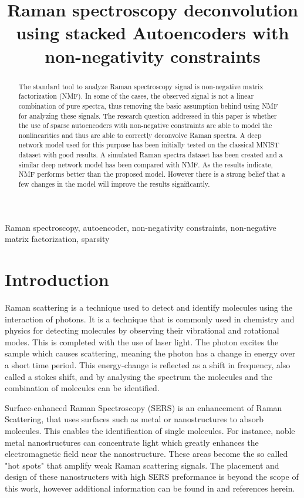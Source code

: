 \documentclass{article}
\title{Raman spectroscopy deconvolution using stacked Autoencoders with non-negativity constraints}
\begin{document}
%

\maketitle
%
\begin{abstract}
The standard tool to analyze Raman spectroscopy signal is non-negative matrix factorization (NMF). In some of the cases, the observed signal is not a linear combination of pure spectra, thus removing the basic assumption behind using NMF for analyzing these signals. The research question addressed in this paper is whether the use of sparse autoencoders with non-negative constraints are able to model the nonlinearities and thus are able to correctly deconvolve Raman spectra. A deep network model used for this purpose has been initially tested on the classical MNIST dataset with good results. A simulated Raman spectra dataset has been created and a similar deep network model has been compared with NMF. As the results indicate, NMF performs better than the proposed model. However there is a strong belief that a few changes in the model will improve the results significantly.
\end{abstract}
%
\begin{keywords}
Raman spectroscopy, autoencoder, non-negativity constraints, non-negative matrix factorization, sparsity
\end{keywords}
%
\section{Introduction}
\label{sec:intro}

Raman scattering is a technique used to detect and identify molecules using the interaction of photons. It is a technique that is commonly used in chemistry and physics for detecting molecules by observing their vibrational and rotational modes. This is completed with the use of laser light. The photon excites the sample which causes scattering, meaning the photon has a change in energy over a short time period. This energy-change is reflected as a shift in frequency, also called a stokes shift, and by analysing the spectrum the molecules and the combination of molecules can be identified. 

Surface-enhanced Raman Spectroscopy (SERS) is an enhancement of Raman Scattering, that uses surfaces such as metal or nanostructures to absorb molecules. This enables the identification of single molecules.  For instance, noble metal nanostructures can concentrate light which greatly enhances the electromagnetic field near the nanostructure. These areas become the so called "hot spots" that amplify weak Raman scattering signals. The placement and design of these nanostructers with high SERS preformance is beyond the scope of this work, however additional information can be found in \cite{Wei2013} and references herein.
\end{document}
